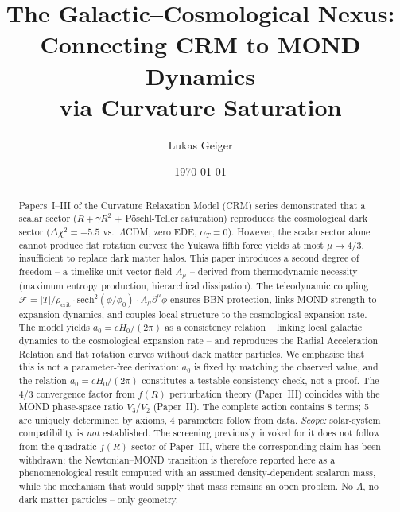 \documentclass[aps,prd,twocolumn,superscriptaddress,nofootinbib]{revtex4-2}
\begin{document}

\title{The Galactic--Cosmological Nexus: Connecting CRM to MOND Dynamics\\via Curvature Saturation}

\author{Lukas Geiger}

\date{\today}

\begin{abstract}
Papers~I--III of the Curvature Relaxation Model (CRM) series demonstrated that a scalar sector ($R + \gamma R^2$ + P\"oschl-Teller saturation) reproduces the cosmological dark sector ($\Delta\chi^2 = -5.5$ vs.\ $\Lambda$CDM, zero EDE, $\alpha_T = 0$). However, the scalar sector alone cannot produce flat rotation curves: the Yukawa fifth force yields at most $\mu \to 4/3$, insufficient to replace dark matter halos. This paper introduces a second degree of freedom -- a timelike unit vector field $A_\mu$ -- derived from thermodynamic necessity (maximum entropy production, hierarchical dissipation). The teleodynamic coupling $\mathcal{F} = |T|/\rho_{\mathrm{crit}} \cdot \mathrm{sech}^2(\phi/\phi_0) \cdot A_\mu\partial^\mu\phi$ ensures BBN protection, links MOND strength to expansion dynamics, and couples local structure to the cosmological expansion rate. The model yields $a_0 = cH_0/(2\pi)$ as a consistency relation -- linking local galactic dynamics to the cosmological expansion rate -- and reproduces the Radial Acceleration Relation and flat rotation curves without dark matter particles. We emphasise that this is not a parameter-free derivation: $a_0$ is fixed by matching the observed value, and the relation $a_0 = cH_0/(2\pi)$ constitutes a testable consistency check, not a proof. The $4/3$ convergence factor from $f(R)$ perturbation theory (Paper~III) coincides with the MOND phase-space ratio $V_3/V_2$ (Paper~II). The complete action contains 8 terms; 5 are uniquely determined by axioms, 4 parameters follow from data. \textit{Scope:} solar-system compatibility is \textit{not} established. The screening previously invoked for it does not follow from the quadratic $f(R)$ sector of Paper~III, where the corresponding claim has been withdrawn; the Newtonian--MOND transition is therefore reported here as a phenomenological result computed with an assumed density-dependent scalaron mass, while the mechanism that would supply that mass remains an open problem. No $\Lambda$, no dark matter particles -- only geometry.
\end{abstract}
\end{document}
